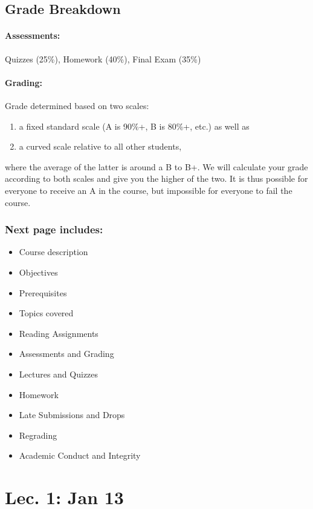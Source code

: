 \subsection*{Grade Breakdown}

\paragraph*{Assessments:} Quizzes (25\%), Homework (40\%), 	Final Exam (35\%)

\paragraph*{Grading: } Grade determined based on two scales:
\begin{enumerate}
\item a fixed standard scale (A is 90\%+, B is 80\%+, etc.) as well as
\item a curved scale relative to all other students,
\end{enumerate}
where the average of the latter is around a B to B+. We will calculate your grade according to both scales and give you the higher of the two. It is thus possible
for everyone to receive an A in the course, but impossible for everyone to fail the course.

\subsubsection*{Next page includes:}
\begin{itemize}
	\item Course description
	\item Objectives
	\item Prerequisites
	\item Topics covered
	\item Reading Assignments
	\item Assessments and Grading
	\item Lectures and Quizzes
	\item Homework
	\item Late Submissions and Drops
	\item Regrading
	\item Academic Conduct and Integrity
\end{itemize}

\section{Lec. 1: Jan 13}



